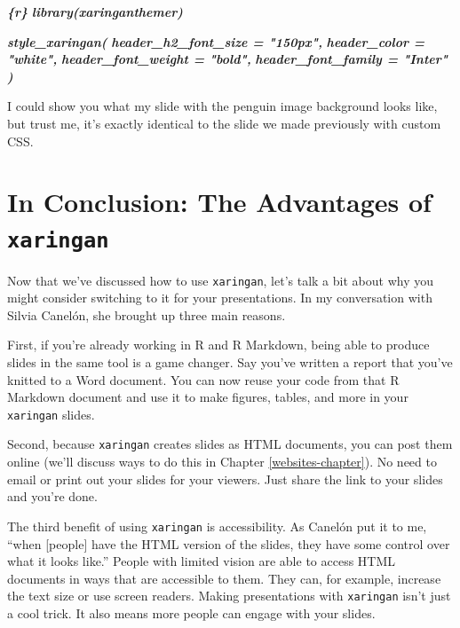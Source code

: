 \documentclass[
]{book}
\newenvironment{Shaded}{\begin{snugshade}}{\end{snugshade}}
\newcommand{\InformationTok}[1]{\textcolor[rgb]{0.56,0.35,0.01}{\textbf{\textit{#1}}}}
\begin{document}
\begin{Shaded}
\begin{Highlighting}[]
\InformationTok{\textasciigrave{}\textasciigrave{}\textasciigrave{}\{r\}}
\InformationTok{library(xaringanthemer)}

\InformationTok{style\_xaringan(}
\InformationTok{  header\_h2\_font\_size = "150px",}
\InformationTok{  header\_color = "white",}
\InformationTok{  header\_font\_weight = "bold",}
\InformationTok{  header\_font\_family = "Inter"}
\InformationTok{)}
\InformationTok{\textasciigrave{}\textasciigrave{}\textasciigrave{}}
\end{Highlighting}
\end{Shaded}

I could show you what my slide with the penguin image background looks like, but trust me, it's exactly identical to the slide we made previously with custom CSS.

\hypertarget{in-conclusion-the-advantages-of-xaringan}{%
\section*{\texorpdfstring{In Conclusion: The Advantages of \texttt{xaringan}}{In Conclusion: The Advantages of xaringan}}\label{in-conclusion-the-advantages-of-xaringan}}

Now that we've discussed how to use \texttt{xaringan}, let's talk a bit about why you might consider switching to it for your presentations. In my conversation with Silvia Canelón, she brought up three main reasons.

First, if you're already working in R and R Markdown, being able to produce slides in the same tool is a game changer. Say you've written a report that you've knitted to a Word document. You can now reuse your code from that R Markdown document and use it to make figures, tables, and more in your \texttt{xaringan} slides.

Second, because \texttt{xaringan} creates slides as HTML documents, you can post them online (we'll discuss ways to do this in Chapter \ref{websites-chapter}). No need to email or print out your slides for your viewers. Just share the link to your slides and you're done.

The third benefit of using \texttt{xaringan} is accessibility. As Canelón put it to me, ``when {[}people{]} have the HTML version of the slides, they have some control over what it looks like.'' People with limited vision are able to access HTML documents in ways that are accessible to them. They can, for example, increase the text size or use screen readers. Making presentations with \texttt{xaringan} isn't just a cool trick. It also means more people can engage with your slides.
\end{document}
